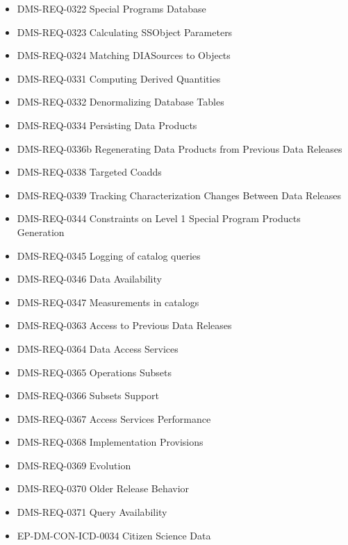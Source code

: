 \begin{itemize}
\item DMS-REQ-0322 Special Programs Database
\item DMS-REQ-0323 Calculating SSObject Parameters
\item DMS-REQ-0324 Matching DIASources to Objects
\item DMS-REQ-0331 Computing Derived Quantities
\item DMS-REQ-0332 Denormalizing Database Tables
\item DMS-REQ-0334 Persisting Data Products
\item DMS-REQ-0336b Regenerating Data Products from Previous Data Releases
\item DMS-REQ-0338 Targeted Coadds
\item DMS-REQ-0339 Tracking Characterization Changes Between Data Releases
\item DMS-REQ-0344 Constraints on Level 1 Special Program Products Generation
\item DMS-REQ-0345 Logging of catalog queries
\item DMS-REQ-0346 Data Availability
\item DMS-REQ-0347 Measurements in catalogs
\item DMS-REQ-0363 Access to Previous Data Releases
\item DMS-REQ-0364 Data Access Services
\item DMS-REQ-0365 Operations Subsets
\item DMS-REQ-0366 Subsets Support
\item DMS-REQ-0367 Access Services Performance
\item DMS-REQ-0368 Implementation Provisions
\item DMS-REQ-0369 Evolution
\item DMS-REQ-0370 Older Release Behavior
\item DMS-REQ-0371 Query Availability
\item EP-DM-CON-ICD-0034 Citizen Science Data
\end{itemize}
